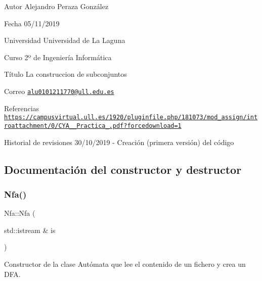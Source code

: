 \begin{DoxyAuthor}{Autor}
Alejandro Peraza González 
\end{DoxyAuthor}
\begin{DoxyDate}{Fecha}
05/11/2019 
\end{DoxyDate}
\begin{DoxyParagraph}{Universidad}
Universidad de La Laguna 
\end{DoxyParagraph}
\begin{DoxyParagraph}{Curso}
2º de Ingeniería Informática 
\end{DoxyParagraph}
\begin{DoxyParagraph}{Título}
La construccion de subconjuntos 
\end{DoxyParagraph}
\begin{DoxyParagraph}{Correo }
\href{mailto:alu0101211770@ull.edu.es}{\tt alu0101211770@ull.\+edu.\+es} 
\end{DoxyParagraph}
\begin{DoxyParagraph}{Referencias}
\href{https://campusvirtual.ull.es/1920/pluginfile.php/181073/mod_assign/introattachment/0/CYA_1920_Practica_7.pdf?forcedownload=1}{\tt https\+://campusvirtual.\+ull.\+es/1920/pluginfile.\+php/181073/mod\+\_\+assign/introattachment/0/\+C\+Y\+A\+\_\+\_\+\+Practica\+\_.\+pdf?forcedownload=1} 
\end{DoxyParagraph}
\begin{DoxyParagraph}{Historial de revisiones}
30/10/2019 -\/ Creación (primera versión) del código 
\end{DoxyParagraph}


\subsection{Documentación del constructor y destructor}
\mbox{\label{classNfa_aca6d706a62e9739d7eda1a33c2a8a7c4}} 
\subsubsection{\texorpdfstring{Nfa()}{Nfa()}}
{\footnotesize\ttfamily Nfa\+::\+Nfa (\begin{DoxyParamCaption}\item[{std\+::istream \&}]{is }\end{DoxyParamCaption})}



Constructor de la clase Autómata que lee el contenido de un fichero y crea un D\+FA. 


